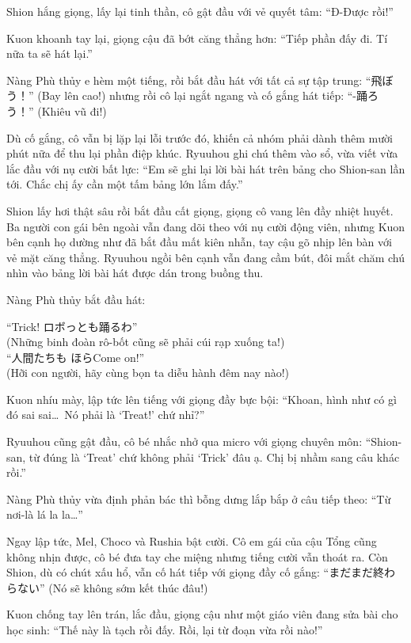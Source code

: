 \documentclass[../main.tex]{subfiles}
\begin{document}
Shion hắng giọng, lấy lại tinh thần, cô gật đầu với vẻ quyết tâm: ``Đ-Được rồi!''

Kuon khoanh tay lại, giọng cậu đã bớt căng thẳng hơn: ``Tiếp phần đấy đi. Tí nữa ta sẽ hát lại.''

Nàng Phù thủy e hèm một tiếng, rồi bắt đầu hát với tất cả sự tập trung: ``飛ぼう！'' (Bay lên cao!) nhưng rồi cô lại ngắt ngang và cố gắng hát tiếp: ``-踊ろう！'' (Khiêu vũ đi!)

Dù cố gắng, cô vẫn bị lặp lại lỗi trước đó, khiến cả nhóm phải dành thêm mười phút nữa để thu lại phần điệp khúc. Ryuuhou ghi chú thêm vào sổ, vừa viết vừa lắc đầu với nụ cười bất lực: ``Em sẽ ghi lại lời bài hát trên bảng cho Shion-san lần tới. Chắc chị ấy cần một tấm bảng lớn lắm đấy.''


Shion lấy hơi thật sâu rồi bắt đầu cất giọng, giọng cô vang lên đầy nhiệt huyết. Ba người con gái bên ngoài vẫn đang dõi theo với nụ cười động viên, nhưng Kuon bên cạnh họ dường như đã bắt đầu mất kiên nhẫn, tay cậu gõ nhịp lên bàn với vẻ mặt căng thẳng. Ryuuhou ngồi bên cạnh vẫn đang cầm bút, đôi mắt chăm chú nhìn vào bảng lời bài hát được dán trong buồng thu.

Nàng Phù thủy bắt đầu hát:

``{\fotskip Trick! ロボっとも踊るわ}''\\(Những binh đoàn rô-bốt cũng sẽ phải cúi rạp xuống ta!)\\
``{\fotskip 人間たちも ほらCome on!}''\\(Hỡi con người, hãy cùng bọn ta diễu hành đêm nay nào!)

Kuon nhíu mày, lập tức lên tiếng với giọng đầy bực bội: ``Khoan, hình như có gì đó sai sai\dots\ Nó phải là `Treat!' chứ nhỉ?''

Ryuuhou cũng gật đầu, cô bé nhắc nhở qua micro với giọng chuyên môn: ``Shion-san, từ đúng là `Treat' chứ không phải `Trick' đâu ạ. Chị bị nhầm sang câu khác rồi.''

Nàng Phù thủy vừa định phản bác thì bỗng dưng lắp bắp ở câu tiếp theo: ``Từ nơi-là lá la la\dots''


Ngay lập tức, Mel, Choco và Rushia bật cười. Cô em gái của cậu Tổng cũng không nhịn được, cô bé đưa tay che miệng nhưng tiếng cười vẫn thoát ra. Còn Shion, dù có chút xấu hổ, vẫn cố hát tiếp với giọng đầy cố gắng: ``{\fotskip まだまだ終わらない}'' (Nó sẽ không sớm kết thúc đâu!)

Kuon chống tay lên trán, lắc đầu, giọng cậu như một giáo viên đang sửa bài cho học sinh: ``Thế này là tạch rồi đấy. Rồi, lại từ đoạn vừa rồi nào!''
\end{document}
